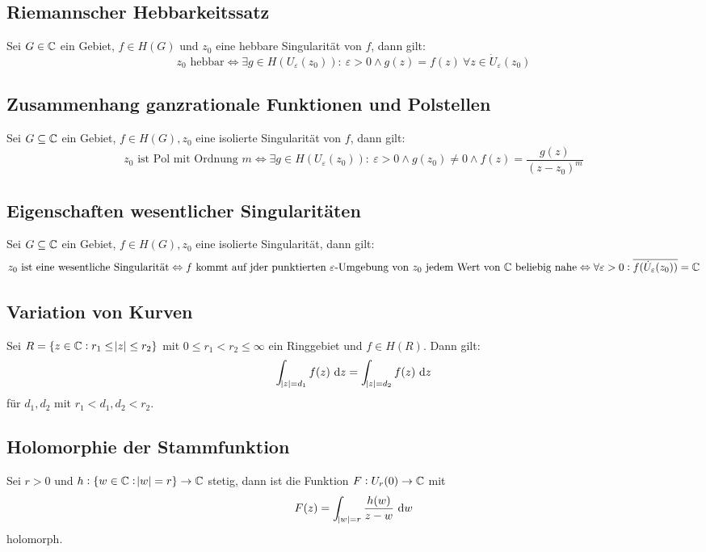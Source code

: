 \subsection{Riemannscher Hebbarkeitssatz}
Sei $G \in \mathbb{C}$ ein Gebiet, $f \in H(G)$ und $z_0$ eine hebbare Singularität von $f$, dann gilt:
\begin{equation*}
    z_0 \text{ hebbar} \Leftrightarrow \exists g \in H(U_\varepsilon(z_0)):\ \varepsilon > 0 \land g(z) = f(z)\ 
    \forall z \in \dot{U}_\varepsilon(z_0)
\end{equation*}

\subsection{Zusammenhang ganzrationale Funktionen und Polstellen}
Sei $G \subseteq \mathbb{C}$ ein Gebiet, $ f \in H(G), z_0$ eine isolierte Singularität von $f$, dann gilt:
\begin{equation*}
    z_0 \text{ ist Pol mit Ordnung } m \Leftrightarrow \exists g \in H(U_\varepsilon(z_0)):\ \varepsilon > 0 \land
    g(z_0) \neq 0 \land f(z) = \frac{g(z)}{{(z-z_0)}^m}
\end{equation*}

\subsection{Eigenschaften wesentlicher Singularitäten}
Sei $G \subseteq \mathbb{C}$ ein Gebiet, $f \in H(G), z_0$ eine isolierte Singularität, dann gilt:
\begin{equation*}
    z_0 \text{ ist eine wesentliche Singularität} \Leftrightarrow f \text{ kommt auf jder punktierten } \varepsilon
    \text{-Umgebung von } z_0 \text{ jedem Wert von } \mathbb{C} \text{ beliebig nahe} \Leftrightarrow
    \forall \varepsilon > 0: \overline{f(\dot{U}_\varepsilon (z_0))} = \mathbb{C}
\end{equation*}

\subsection{Variation von Kurven}
Sei $R=\{z \in \mathbb{C}: r_1 \leq \abs{z} \leq r_2\}$ mit $0 \leq r_1 < r_2 \leq \infty$ ein Ringgebiet und $f \in H(R)$.
Dann gilt:
\begin{equation*}
    \int_{\abs{z} = d_1} f(z) \text{ d}z = \int_{\abs{z} = d_2} f(z) \text{ d}z
\end{equation*}
für $d_1, d_2$ mit $r_1 < d_1, d_2 < r_2$.

\subsection{Holomorphie der Stammfunktion}
Sei $r>0$ und $h: \{ w \in \mathbb{C}: \abs{w} = r\} \to \mathbb{C}$ stetig, dann ist die Funktion $F: U_r(0) \to \mathbb{C}$ mit
\begin{equation*}
    F(z) = \int_{\abs{w} = r} \frac{h(w)}{z-w} \text{ d}w
\end{equation*}
holomorph.

